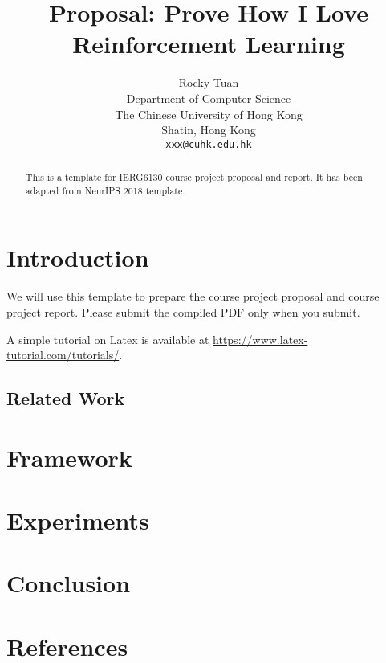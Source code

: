 \documentclass{article}
\title{Proposal: Prove How I Love Reinforcement Learning}
\author{%
  Rocky Tuan \\
  Department of Computer Science\\
  The Chinese University of Hong Kong\\
  Shatin, Hong Kong \\
  \texttt{xxx@cuhk.edu.hk} \\
}
\begin{document}

\maketitle

\begin{abstract}
This is a template for IERG6130 course project proposal and report. It has been adapted from NeurIPS 2018 template. 
\end{abstract}

\section{Introduction}

We will use this template to prepare the course project proposal and course project report. Please submit the compiled PDF only when you submit. 

A simple tutorial on Latex is available at \url{https://www.latex-tutorial.com/tutorials/}.


\subsection{Related Work}


\section{Framework}


\section{Experiments}



\section{Conclusion}





\section*{References}

\medskip

{\small


}
\end{document}
